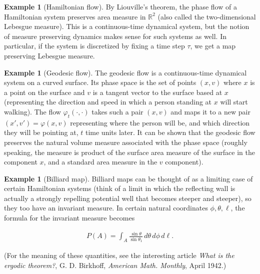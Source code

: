 \documentclass[11pt]{report}
\theoremstyle{plain}
\theoremstyle{definition}
\newtheorem{example}[thm]{Example}
\begin{document}
\begin{example}[Hamiltonian flow]
By Liouville's theorem, the phase flow of a
Hamiltonian system preserves area measure in
$\mathbb{R}^2$ (also called the two-dimensional
Lebesgue measure). This is a continuous-time dynamical
system, but the notion of measure preserving dynamics
makes sense for such systems as well. In particular,
if the system is discretized by fixing a time step
$\tau$, we get a map preserving Lebesgue measure.
\end{example}

\begin{example}[Geodesic flow]
The geodesic flow is a continuous-time dynamical
system on a curved surface. Its phase space is the set
of points $(x,v)$ where $x$ is a point on the surface
and $v$ is a tangent vector to the surface based at
$x$ (representing the direction and speed in which a
person standing at $x$ will start walking). The flow
$\varphi_t(\cdot,\cdot)$ takes such a pair $(x,v)$
and maps it to a new pair $(x',v')=\varphi(x,v)$
representing where the person will be, and which
direction they will be pointing at, $t$ time units
later. It can be shown that the geodesic flow
preserves the natural volume measure associated with
the phase space (roughly speaking, the measure is
product of the surface area measure of the surface in
the component $x$, and a standard area measure in the
$v$ component).
\end{example}

\begin{example}[Billiard map]
Billiard maps can be thought of as a limiting case of
certain Hamiltonian systems (think of a limit in which
the reflecting wall is actually a strongly repelling
potential well that becomes steeper and steeper), so
they too have an invariant measure. In certain natural
coordinates $\phi, \theta, \ell$, the formula for the
invariant measure becomes

\begin{align*}
P(A) = \int_A \frac{\sin \theta}{\sin \theta_1}\, d\theta\, d\phi\, d\ell.
\end{align*}

(For the meaning of these quantities, see the
interesting article \emph{What is the ergodic theorem?}, G.
D. Birkhoff, \emph{American Math. Monthly}, April 1942.)
\end{example}
\end{document}
